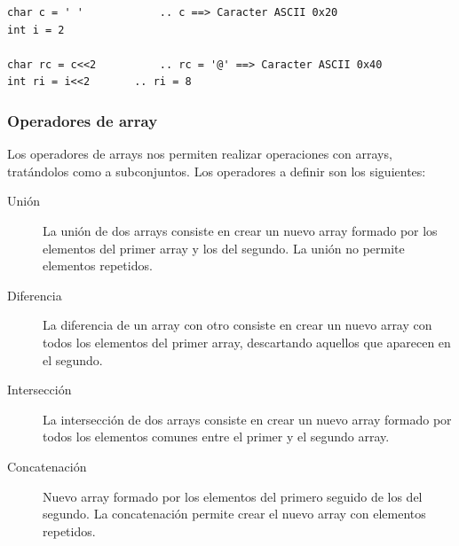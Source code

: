 \documentclass[11pt, english]{article}
\begin{document}
\begin{lstlisting}[caption=Ejemplo de uso los operadores bit a bit]
char c = ' '			.. c ==> Caracter ASCII 0x20
int i = 2

char rc = c<<2			.. rc = '@' ==> Caracter ASCII 0x40
int ri = i<<2  		.. ri = 8

\end{lstlisting}

\subsubsection{Operadores de array}
Los operadores de arrays nos permiten realizar operaciones con arrays, tratándolos como a subconjuntos. Los operadores a definir son los siguientes:
\begin{description}
	\item [Unión] La unión de dos arrays consiste en crear un nuevo array formado por los elementos del primer array y los del segundo. La unión no permite elementos repetidos.
	\item [Diferencia] La  diferencia de un array con otro consiste en crear un nuevo array con todos los elementos del primer array, descartando aquellos que aparecen en el segundo.
	\item [Intersección] La intersección de dos arrays consiste en crear un nuevo array formado por todos los elementos comunes entre el primer y el segundo array.
	\item [Concatenación] Nuevo array formado por los elementos del primero seguido de los del segundo. La concatenación permite crear el nuevo array con elementos repetidos.
\end{description}
\end{document}

